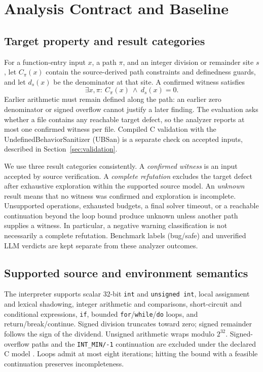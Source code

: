\documentclass[sigconf]{acmart}
\begin{document}
\section{Analysis Contract and Baseline}
\label{sec:contract}
\subsection{Target property and result categories}
For a function-entry input $x$, a path $\pi$, and an integer division or
remainder site $s$, let $C_\pi(x)$ contain the source-derived path constraints
and definedness guards, and let $d_s(x)$ be the denominator at that site.
A confirmed witness satisfies
\begin{equation}
  \exists x,\pi:\ C_\pi(x)\ \land\ d_s(x)=0.
  \label{eq:acceptance}
\end{equation}
Earlier arithmetic must remain defined along the path: an earlier zero
denominator or signed overflow cannot justify a later finding. The evaluation
asks whether a file contains any reachable target defect, so the analyzer
reports at most one confirmed witness per file. Compiled C validation with the UndefinedBehaviorSanitizer (UBSan)
is a separate check on accepted inputs, described in Section~\ref{sec:validation}.

We use three result categories consistently. A \emph{confirmed witness} is
an input accepted by source verification. A \emph{complete refutation}
excludes the target defect after exhaustive exploration within the supported
source model. An \emph{unknown} result means that no witness was confirmed
and exploration is incomplete. Unsupported operations, exhausted budgets,
a final solver timeout, or a reachable continuation beyond the loop bound
produce unknown unless another path supplies a witness. In particular, a
negative warning classification is not necessarily a complete refutation.
Benchmark labels (bug/safe) and unverified LLM verdicts are kept separate
from these analyzer outcomes.

\subsection{Supported source and environment semantics}
The interpreter supports scalar 32-bit \texttt{int} and \texttt{unsigned int},
local assignment and lexical shadowing, integer arithmetic and comparisons,
short-circuit and conditional expressions, \texttt{if}, bounded
\texttt{for}/\texttt{while}/\texttt{do} loops, and return/break/continue.
Signed division truncates toward zero; signed remainder follows the sign
of the dividend. Unsigned arithmetic wraps modulo $2^{32}$. Signed-overflow
paths and the \texttt{INT\_MIN/-1} continuation are excluded under the declared
C model \cite{c11}. Loops admit at most eight iterations; hitting the bound
with a feasible continuation preserves incompleteness.
\end{document}
